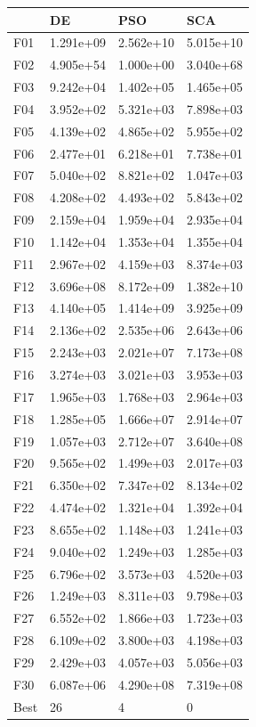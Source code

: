 \begin{tabular}{llll}
\toprule
{} &         DE &        PSO &        SCA \\
\midrule
F01  &  1.291e+09 &  2.562e+10 &  5.015e+10 \\
F02  &  4.905e+54 &  1.000e+00 &  3.040e+68 \\
F03  &  9.242e+04 &  1.402e+05 &  1.465e+05 \\
F04  &  3.952e+02 &  5.321e+03 &  7.898e+03 \\
F05  &  4.139e+02 &  4.865e+02 &  5.955e+02 \\
F06  &  2.477e+01 &  6.218e+01 &  7.738e+01 \\
F07  &  5.040e+02 &  8.821e+02 &  1.047e+03 \\
F08  &  4.208e+02 &  4.493e+02 &  5.843e+02 \\
F09  &  2.159e+04 &  1.959e+04 &  2.935e+04 \\
F10  &  1.142e+04 &  1.353e+04 &  1.355e+04 \\
F11  &  2.967e+02 &  4.159e+03 &  8.374e+03 \\
F12  &  3.696e+08 &  8.172e+09 &  1.382e+10 \\
F13  &  4.140e+05 &  1.414e+09 &  3.925e+09 \\
F14  &  2.136e+02 &  2.535e+06 &  2.643e+06 \\
F15  &  2.243e+03 &  2.021e+07 &  7.173e+08 \\
F16  &  3.274e+03 &  3.021e+03 &  3.953e+03 \\
F17  &  1.965e+03 &  1.768e+03 &  2.964e+03 \\
F18  &  1.285e+05 &  1.666e+07 &  2.914e+07 \\
F19  &  1.057e+03 &  2.712e+07 &  3.640e+08 \\
F20  &  9.565e+02 &  1.499e+03 &  2.017e+03 \\
F21  &  6.350e+02 &  7.347e+02 &  8.134e+02 \\
F22  &  4.474e+02 &  1.321e+04 &  1.392e+04 \\
F23  &  8.655e+02 &  1.148e+03 &  1.241e+03 \\
F24  &  9.040e+02 &  1.249e+03 &  1.285e+03 \\
F25  &  6.796e+02 &  3.573e+03 &  4.520e+03 \\
F26  &  1.249e+03 &  8.311e+03 &  9.798e+03 \\
F27  &  6.552e+02 &  1.866e+03 &  1.723e+03 \\
F28  &  6.109e+02 &  3.800e+03 &  4.198e+03 \\
F29  &  2.429e+03 &  4.057e+03 &  5.056e+03 \\
F30  &  6.087e+06 &  4.290e+08 &  7.319e+08 \\
Best &         26 &          4 &          0 \\
\bottomrule
\end{tabular}
